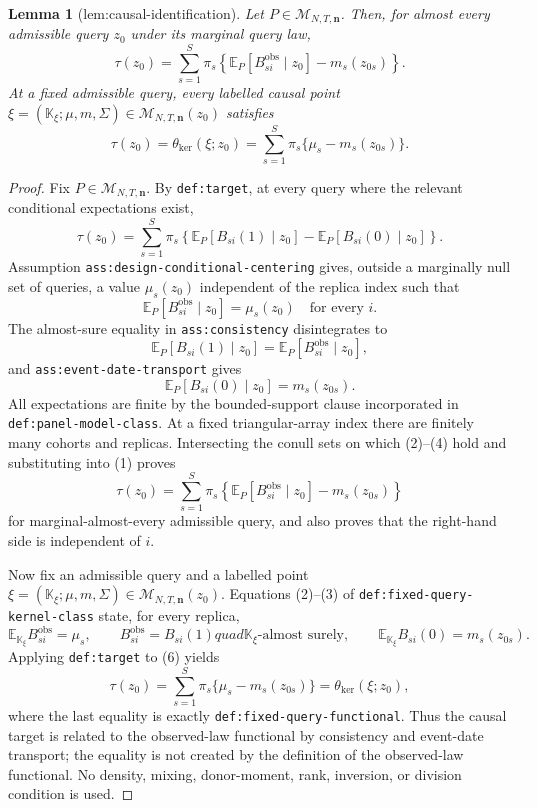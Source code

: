 \documentclass{article}
\newtheorem{lemma}{Lemma}
\begin{document}
\begin{lemma}[lem:causal-identification]\label{lem:causal-identification}
Let \(P\in\mathcal M_{N,T,\mathbf n}\).  Then, for almost every admissible query \(z_0\) under its marginal query law,
\[
 \tau(z_0)=\sum_{s=1}^{S}\pi_s\left\{
 \mathbb E_P[B_{si}^{\mathrm{obs}}\mid z_0]-m_s(z_{0s})\right\}.
\]
At a fixed admissible query, every labelled causal point \(\xi=(\mathbb K_\xi;\mu,m,\Sigma)\in\mathcal M_{N,T,\mathbf n}(z_0)\) satisfies
\[
 \tau(z_0)=\theta_{\mathrm{ker}}(\xi;z_0)
 =\sum_{s=1}^{S}\pi_s\{\mu_s-m_s(z_{0s})\}.
\]
\end{lemma}
\begin{proof}
Fix \(P\in\mathcal M_{N,T,\mathbf n}\).  By \texttt{def:target}, at every query where the relevant conditional expectations exist,
\[
 \tau(z_0)=\sum_{s=1}^{S}\pi_s\left\{
 \mathbb E_P[B_{si}(1)\mid z_0]-
 \mathbb E_P[B_{si}(0)\mid z_0]\right\}.                 \tag{1}
\]
Assumption \texttt{ass:design-conditional-centering} gives, outside a marginally null set of queries, a value \(\mu_s(z_0)\) independent of the replica index such that
\[
 \mathbb E_P[B_{si}^{\mathrm{obs}}\mid z_0]=\mu_s(z_0)
 \quad\text{for every }i.                                  \tag{2}
\]
The almost-sure equality in \texttt{ass:consistency} disintegrates to
\[
 \mathbb E_P[B_{si}(1)\mid z_0]
 =\mathbb E_P[B_{si}^{\mathrm{obs}}\mid z_0],               \tag{3}
\]
and \texttt{ass:event-date-transport} gives
\[
 \mathbb E_P[B_{si}(0)\mid z_0]=m_s(z_{0s}).                \tag{4}
\]
All expectations are finite by the bounded-support clause incorporated in \texttt{def:panel-model-class}.  At a fixed triangular-array index there are finitely many cohorts and replicas.  Intersecting the conull sets on which (2)--(4) hold and substituting into (1) proves
\[
 \tau(z_0)=\sum_{s=1}^{S}\pi_s\left\{
 \mathbb E_P[B_{si}^{\mathrm{obs}}\mid z_0]-m_s(z_{0s})
 \right\}                                                   \tag{5}
\]
for marginal-almost-every admissible query, and also proves that the right-hand side is independent of \(i\).

Now fix an admissible query and a labelled point
\(\xi=(\mathbb K_\xi;\mu,m,\Sigma)\in
\mathcal M_{N,T,\mathbf n}(z_0)\).  Equations (2)--(3) of
\texttt{def:fixed-query-kernel-class} state, for every replica,
\[
 \mathbb E_{\mathbb K_\xi}B_{si}^{\mathrm{obs}}=\mu_s,
 \qquad B_{si}^{\mathrm{obs}}=B_{si}(1)quad
 \mathbb K_\xi\text{-almost surely},
 \qquad
 \mathbb E_{\mathbb K_\xi}B_{si}(0)=m_s(z_{0s}).           \tag{6}
\]
Applying \texttt{def:target} to (6) yields
\[
 \tau(z_0)=\sum_{s=1}^{S}\pi_s\{\mu_s-m_s(z_{0s})\}
 =\theta_{\mathrm{ker}}(\xi;z_0),                           \tag{7}
\]
where the last equality is exactly \texttt{def:fixed-query-functional}.  Thus the causal target is related to the observed-law functional by consistency and event-date transport; the equality is not created by the definition of the observed-law functional.  No density, mixing, donor-moment, rank, inversion, or division condition is used.
\end{proof}
\end{document}
